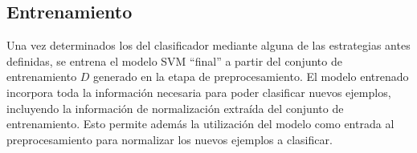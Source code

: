 %
%
\subsection{Entrenamiento}
%
Una vez determinados los  del clasificador mediante alguna
de las estrategias antes definidas, se entrena el modelo SVM ``final''
a partir del conjunto de entrenamiento $D$ generado en la etapa de
preprocesamiento.
El modelo entrenado incorpora toda la información necesaria para poder
clasificar nuevos ejemplos, incluyendo la información de normalización
extraída del conjunto de entrenamiento.
Esto permite además la utilización del modelo como entrada al
preprocesamiento para normalizar los nuevos ejemplos a clasificar.
